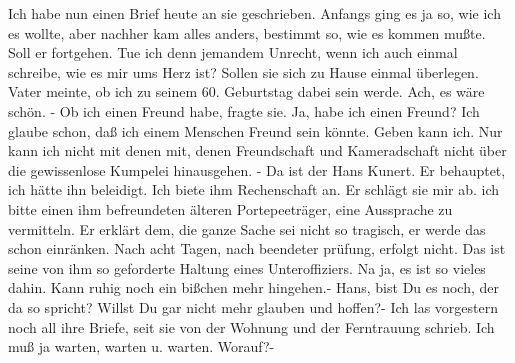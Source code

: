 \def\day{18. Juni 1944}
\mktitle

Ich habe nun einen Brief heute an sie geschrieben.
Anfangs ging es ja so, wie ich es wollte, aber nachher kam alles anders, bestimmt so, wie es kommen mu{\ss}te.
Soll er fortgehen.
Tue ich denn jemandem Unrecht, wenn ich auch einmal schreibe, wie es mir ums Herz ist?
Sollen sie sich zu Hause einmal \"{u}berlegen.
Vater meinte, ob ich zu seinem 60. Geburtstag dabei sein werde.
Ach, es w\"{a}re sch\"{o}n.
- Ob ich einen Freund habe, fragte sie.
Ja, habe ich einen Freund?
Ich glaube schon, da{\ss} ich einem Menschen Freund sein k\"{o}nnte.
Geben kann ich.
Nur kann ich nicht mit denen mit, denen Freundschaft und Kameradschaft nicht \"{u}ber die gewissenlose Kumpelei hinausgehen.
- Da ist der Hans Kunert.
Er behauptet, ich h\"{a}tte ihn beleidigt.
Ich biete ihm Rechenschaft an.
Er schl\"{a}gt sie mir ab.
ich bitte einen ihm befreundeten \"{a}lteren Portepeetr\"{a}ger, eine Aussprache zu vermitteln.
Er erkl\"{a}rt dem, die ganze Sache sei nicht so tragisch, er werde das schon einr\"{a}nken.
Nach acht Tagen, nach beendeter pr\"{u}fung, erfolgt nicht.
Das ist seine von ihm so geforderte Haltung eines Unteroffiziers.
Na ja, es ist so vieles dahin.
Kann ruhig noch ein bi{\ss}chen mehr hingehen.-
Hans, bist Du es noch, der da so spricht?
Willst Du gar nicht mehr glauben und hoffen?-
Ich las vorgestern noch all ihre Briefe, seit sie von der Wohnung und der Ferntrauung schrieb.
Ich mu{\ss} ja warten, warten u. warten.
Worauf?-
\clearpage
